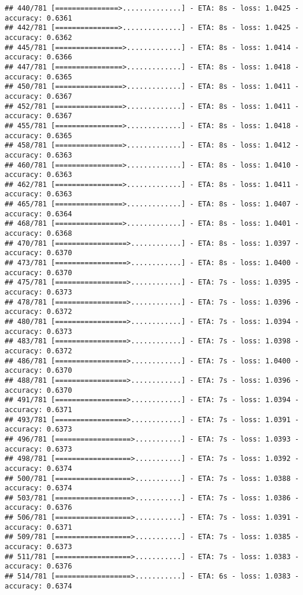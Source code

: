 \documentclass[
]{article}
\begin{document}
\begin{verbatim}
## 440/781 [===============>..............] - ETA: 8s - loss: 1.0425 - accuracy: 0.6361
## 442/781 [===============>..............] - ETA: 8s - loss: 1.0425 - accuracy: 0.6362
## 445/781 [================>.............] - ETA: 8s - loss: 1.0414 - accuracy: 0.6366
## 447/781 [================>.............] - ETA: 8s - loss: 1.0418 - accuracy: 0.6365
## 450/781 [================>.............] - ETA: 8s - loss: 1.0411 - accuracy: 0.6367
## 452/781 [================>.............] - ETA: 8s - loss: 1.0411 - accuracy: 0.6367
## 455/781 [================>.............] - ETA: 8s - loss: 1.0418 - accuracy: 0.6365
## 458/781 [================>.............] - ETA: 8s - loss: 1.0412 - accuracy: 0.6363
## 460/781 [================>.............] - ETA: 8s - loss: 1.0410 - accuracy: 0.6363
## 462/781 [================>.............] - ETA: 8s - loss: 1.0411 - accuracy: 0.6363
## 465/781 [================>.............] - ETA: 8s - loss: 1.0407 - accuracy: 0.6364
## 468/781 [================>.............] - ETA: 8s - loss: 1.0401 - accuracy: 0.6368
## 470/781 [=================>............] - ETA: 8s - loss: 1.0397 - accuracy: 0.6370
## 473/781 [=================>............] - ETA: 8s - loss: 1.0400 - accuracy: 0.6370
## 475/781 [=================>............] - ETA: 7s - loss: 1.0395 - accuracy: 0.6373
## 478/781 [=================>............] - ETA: 7s - loss: 1.0396 - accuracy: 0.6372
## 480/781 [=================>............] - ETA: 7s - loss: 1.0394 - accuracy: 0.6373
## 483/781 [=================>............] - ETA: 7s - loss: 1.0398 - accuracy: 0.6372
## 486/781 [=================>............] - ETA: 7s - loss: 1.0400 - accuracy: 0.6370
## 488/781 [=================>............] - ETA: 7s - loss: 1.0396 - accuracy: 0.6370
## 491/781 [=================>............] - ETA: 7s - loss: 1.0394 - accuracy: 0.6371
## 493/781 [=================>............] - ETA: 7s - loss: 1.0391 - accuracy: 0.6373
## 496/781 [==================>...........] - ETA: 7s - loss: 1.0393 - accuracy: 0.6373
## 498/781 [==================>...........] - ETA: 7s - loss: 1.0392 - accuracy: 0.6374
## 500/781 [==================>...........] - ETA: 7s - loss: 1.0388 - accuracy: 0.6374
## 503/781 [==================>...........] - ETA: 7s - loss: 1.0386 - accuracy: 0.6376
## 506/781 [==================>...........] - ETA: 7s - loss: 1.0391 - accuracy: 0.6371
## 509/781 [==================>...........] - ETA: 7s - loss: 1.0385 - accuracy: 0.6373
## 511/781 [==================>...........] - ETA: 7s - loss: 1.0383 - accuracy: 0.6376
## 514/781 [==================>...........] - ETA: 6s - loss: 1.0383 - accuracy: 0.6374

\end{verbatim}
\end{document}
